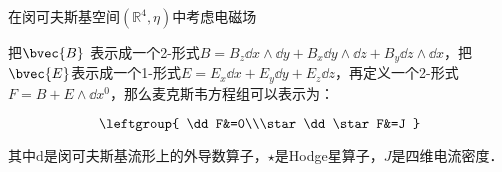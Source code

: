 在闵可夫斯基空间$(\mathbb{R}^4, \eta)$中考虑电磁场

把$\bvec{B}$
表示成一个2-形式$B=B_z\dd x\wedge\dd y+B_x\dd y\wedge\dd z+B_y\dd z\wedge\dd x$，把$\bvec{E}$表示成一个1-形式$E=E_x\dd x+E_y\dd y+E_z\dd z$，再定义一个2-形式$F=B+E\wedge\dd x^0$，那么麦克斯韦方程组可以表示为：

\begin{equation}
\leftgroup{
\dd F&=0\\\star\dd\star F&=J
}
\end{equation}

其中$\mathrm{d}$是闵可夫斯基流形上的外导数算子，$\star$是Hodge星算子，$J$是四维电流密度．




